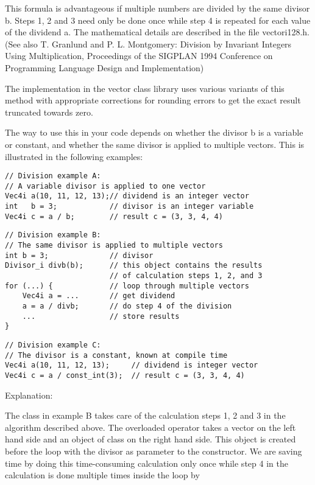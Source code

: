 \documentclass[vcl_manual.tex]{subfiles}
\begin{document}
This formula is advantageous if multiple numbers are divided by the same divisor b. Steps 1, 2 and 3 need only be done once while step 4 is repeated for each value of the dividend a. The mathematical details are described in the file vectori128.h. (See also T. Granlund and P. L. Montgomery: Division by Invariant Integers Using Multiplication, Proceedings of the SIGPLAN 1994 Conference on Programming Language Design and Implementation)

The implementation in the vector class library uses various variants of this method with appropriate corrections for rounding errors to get the exact result truncated towards zero.

The way to use this in your code depends on whether the divisor b is a variable or constant, and whether the same divisor is applied to multiple vectors. This is illustrated in the following examples:

\begin{lstlisting}[frame=none]
// Division example A:
// A variable divisor is applied to one vector
Vec4i a(10, 11, 12, 13);// dividend is an integer vector
int   b = 3;            // divisor is an integer variable
Vec4i c = a / b;        // result c = (3, 3, 4, 4)
\end{lstlisting}

\begin{lstlisting}[frame=none]
// Division example B:
// The same divisor is applied to multiple vectors
int b = 3;              // divisor
Divisor_i divb(b);      // this object contains the results
                        // of calculation steps 1, 2, and 3
for (...) {             // loop through multiple vectors
    Vec4i a = ...       // get dividend
    a = a / divb;       // do step 4 of the division
    ...                 // store results
}
\end{lstlisting}

\begin{lstlisting}[frame=none]
// Division example C:
// The divisor is a constant, known at compile time
Vec4i a(10, 11, 12, 13);     // dividend is integer vector
Vec4i c = a / const_int(3);  // result c = (3, 3, 4, 4)
\end{lstlisting}


Explanation:

The class  in example B takes care of the calculation steps 1, 2 and 3 in the algorithm described above. The overloaded \codei{/} operator takes a vector on the left hand side and an object of class  on the right hand side. This object is created before the loop with the divisor as parameter to the constructor. We are saving time by doing this time-consuming calculation only once while step 4 in the calculation is done multiple times inside the loop by 
\end{document}
